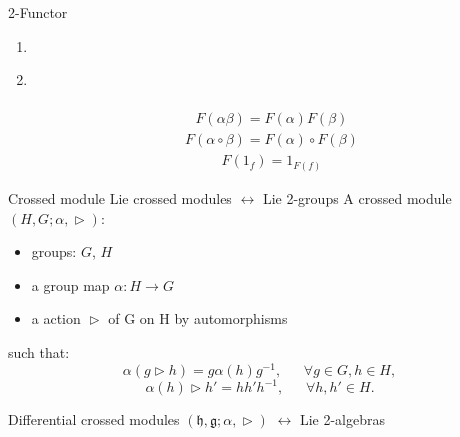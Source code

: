 \documentclass[12pt,aspectratio=53,mathserif]{beamer}
\begin{document}
\begin{frame}
    {2-Functor}
    \begin{enumerate}
        \item {}
        \item {}\\
           \\
        \begin{align}
          F(\alpha \beta)=F(\alpha)F(\beta)
        \end{align}
    \begin{align}
          F(\alpha \circ \beta)=F(\alpha) \circ F(\beta)
       \end{align} 
   \begin{align}
          F(1_f)=1_{F(f)}
        \end{align}
    \end{enumerate}
\end{frame}
  
  
        \begin{frame}{Crossed module}
            {\color{blue} Lie crossed modules $\longleftrightarrow$ Lie 2-groups}
            A crossed module $\left(H,G;\alpha,\vartriangleright \right)$:
            
            \begin{itemize}
                \item  groups: $G$, $H$
                \item a group map $\alpha: H  \longrightarrow G$
                \item a action $\vartriangleright$ of G on H by automorphisms
            \end{itemize}
            such that:
            \begin{equation}
                \alpha \left(g \vartriangleright h\right) = g \alpha \left(h\right) g^{-1}, \ \ \ \ \ \ \ \forall g \in G , h \in H,
            \end{equation}
            \begin{equation}
                \alpha \left(h\right) \vartriangleright h' = h h' h^{-1}, \ \ \ \ \ \ \ \forall h, h' \in H.
            \end{equation}
            
        {\color{red} Differential crossed modules $(\mathfrak{h}, \mathfrak{g}; \alpha, \vartriangleright)$ $\longleftrightarrow$ Lie 2-algebras }
    \end{frame}
\end{document}
